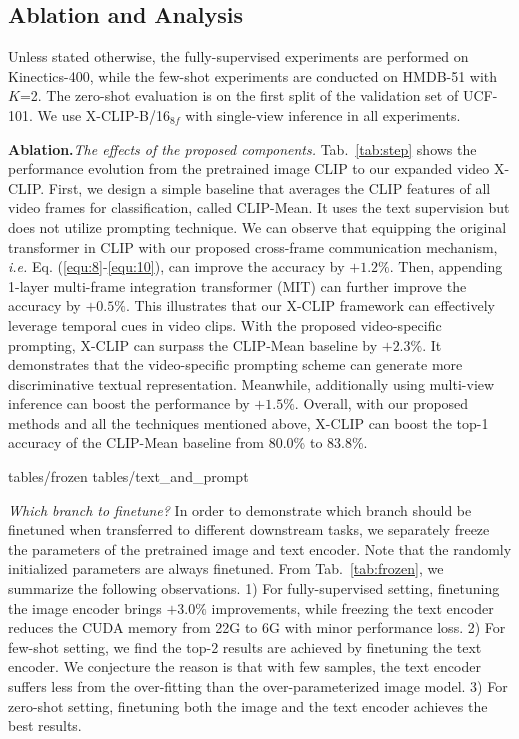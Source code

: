 \documentclass[runningheads]{llncs}
\begin{document}
\subsection{Ablation and Analysis}\label{sec:ablation}
Unless stated otherwise, the fully-supervised experiments are performed on Kinectics-400, while the few-shot experiments are conducted on HMDB-51 with $K$=2. The zero-shot evaluation is on the first split of the validation set of UCF-101. We use X-CLIP-B/16$_{8f}$ with single-view inference in all experiments.

\noindent\textbf{Ablation.}\textit{The effects of the proposed components.} Tab.~\ref{tab:step} shows the performance evolution from the pretrained image CLIP to our expanded video X-CLIP. First, we design a simple baseline that averages the CLIP features of all video frames for classification, called CLIP-Mean. It uses the text supervision but does not utilize prompting technique. We can observe that equipping the original transformer in CLIP with our proposed  cross-frame communication mechanism, \emph{i.e.} Eq. (\ref{equ:8}-\ref{equ:10}), can improve the accuracy by $+1.2\%$. Then, appending 1-layer multi-frame integration transformer (MIT) can further improve the accuracy by $+0.5\%$. This illustrates that our X-CLIP framework can effectively leverage temporal cues in video clips. With the proposed video-specific prompting, X-CLIP can surpass the CLIP-Mean baseline by $+2.3\%$. It demonstrates that the video-specific prompting scheme can generate more discriminative textual representation. Meanwhile, additionally using multi-view inference can boost the performance by $+1.5\%$. Overall, with our proposed methods and all the techniques mentioned above, X-CLIP can boost the top-1 accuracy of the CLIP-Mean baseline from $80.0$\% to $83.8$\%.


{tables/frozen}
{tables/text_and_prompt}


\textit{Which branch to finetune?} In order to demonstrate which branch should be finetuned when transferred to different downstream tasks, we separately freeze the parameters of the pretrained image and text encoder. Note that the randomly initialized parameters are always finetuned. From Tab.~\ref{tab:frozen}, we summarize the following observations. 1) For fully-supervised setting, finetuning the image encoder brings $+3.0\%$ improvements, while freezing the text encoder reduces the CUDA memory from 22G to 6G with minor performance loss. 2) For few-shot setting, we find the top-2 results are achieved by finetuning the text encoder. We conjecture the reason is that with few samples, the text encoder suffers less from the over-fitting than the over-parameterized image model. 3) For zero-shot setting, finetuning both the image and the text encoder achieves the best results.
\end{document}
